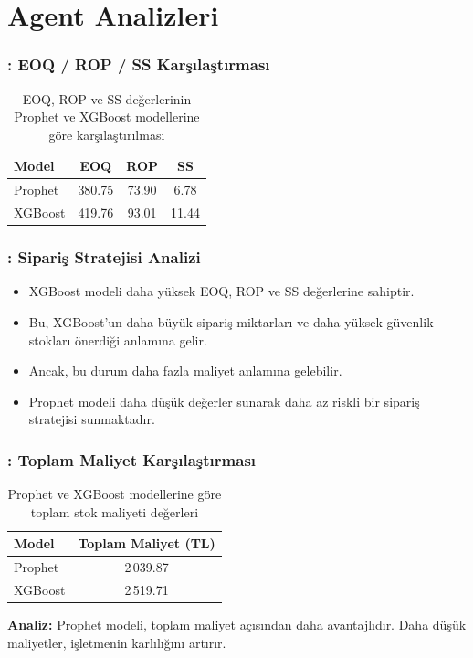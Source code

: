 \documentclass[12pt]{beamer}
\begin{document}
	\section{Agent Analizleri}
	\begin{frame}
		\frametitle{\insertsection: EOQ / ROP / SS Karşılaştırması}
		\begin{table}
			\centering
			\renewcommand{\arraystretch}{1.2}
			\begin{tabular}{l c c c}
				\toprule
				\textbf{Model} & \textbf{EOQ} & \textbf{ROP} &
				\textbf{SS}                                          \\
				\midrule
				Prophet        & 380.75       & 73.90        & 6.78  \\ 
				XGBoost        & 419.76       & 93.01        & 11.44 \\
				\bottomrule
			\end{tabular}
			\vspace{0.3em}
			\caption{\small EOQ, ROP ve SS değerlerinin Prophet ve XGBoost
				modellerine göre karşılaştırılması}
		\end{table}
	\end{frame}
	
	\begin{frame}
		\frametitle{\insertsection: Sipariş Stratejisi Analizi}
		\begin{itemize}
			\item XGBoost modeli daha yüksek EOQ, ROP ve SS değerlerine
			sahiptir.
			\item  Bu, XGBoost'un daha büyük sipariş miktarları ve daha
			yüksek güvenlik stokları önerdiği anlamına gelir.
			\item Ancak, bu durum daha fazla maliyet anlamına gelebilir.
			\item Prophet modeli daha düşük değerler sunarak daha az riskli
			bir sipariş stratejisi sunmaktadır.
		\end{itemize}
	\end{frame}
	
	\begin{frame}
		\frametitle{\insertsection: Toplam Maliyet Karşılaştırması}
		\begin{table}
			\centering
			\small %
			\begin{tabular}{l c}
				\toprule
				\textbf{Model} & \textbf{Toplam Maliyet (TL)} \\
				\midrule
				Prophet        & 2\,039.87                    \\
				XGBoost        & 2\,519.71                    \\
				\bottomrule
			\end{tabular}
			\caption{\small Prophet ve XGBoost modellerine göre toplam stok
				maliyeti değerleri}
		\end{table}
		
		\textbf{Analiz: } Prophet modeli, toplam maliyet açısından daha avantajlıdır.
		Daha düşük maliyetler, işletmenin karlılığını artırır.
	\end{frame}
	
\end{document}
